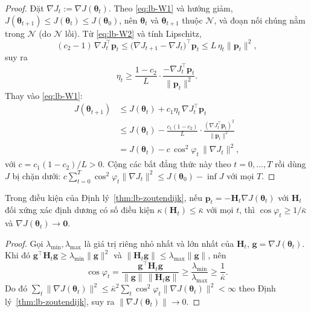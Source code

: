 \begin{proof}
Đặt $\nabla J_t:=\nabla J(\boldsymbol{\theta}_t)$. Theo \eqref{eq:lb-W1} và hướng giảm, $J(\boldsymbol{\theta}_{t+1})\le J(\boldsymbol{\theta}_t)\le J(\boldsymbol{\theta}_0)$, nên $\boldsymbol{\theta}_t$ và $\boldsymbol{\theta}_{t+1}$ thuộc $\mathcal{N}$, và đoạn nối chúng nằm trong $\mathcal{N}$ (do $\mathcal{N}$ lồi). Từ \eqref{eq:lb-W2} và tính Lipschitz,
\begin{equation*}
  (c_2-1)\,\nabla J_t^{\top}\mathbf{p}_t\le\big(\nabla J_{t+1}-\nabla J_t\big)^{\top}\mathbf{p}_t\le L\,\eta_t\|\mathbf{p}_t\|^2,
\end{equation*}
suy ra
\begin{equation*}
  \eta_t\ge\frac{1-c_2}{L}\cdot\frac{-\nabla J_t^{\top}\mathbf{p}_t}{\|\mathbf{p}_t\|^2}.
\end{equation*}
Thay vào \eqref{eq:lb-W1}:
\begin{align*}
  J(\boldsymbol{\theta}_{t+1})&\le J(\boldsymbol{\theta}_t)+c_1\eta_t\,\nabla J_t^{\top}\mathbf{p}_t\\
  &\le J(\boldsymbol{\theta}_t)-\frac{c_1(1-c_2)}{L}\cdot\frac{(\nabla J_t^{\top}\mathbf{p}_t)^2}{\|\mathbf{p}_t\|^2}\\
  &=J(\boldsymbol{\theta}_t)-c\,\cos^2\varphi_t\,\|\nabla J_t\|^2,
\end{align*}
với $c=c_1(1-c_2)/L>0$. Cộng các bất đẳng thức này theo $t=0,\dots,T$ rồi dùng $J$ bị chặn dưới: $c\sum_{t=0}^{T}\cos^2\varphi_t\|\nabla J_t\|^2\le J(\boldsymbol{\theta}_0)-\inf J$ với mọi $T$.
\end{proof}

\begin{proposition}\label{prop:lb-stationary}
Trong điều kiện của Định lý~\ref{thm:lb-zoutendijk}, nếu $\mathbf{p}_t=-\mathbf{H}_t\nabla J(\boldsymbol{\theta}_t)$ với $\mathbf{H}_t$ đối xứng xác định dương có số điều kiện $\kappa(\mathbf{H}_t)\le\bar\kappa$ với mọi $t$, thì $\cos\varphi_t\ge1/\bar\kappa$ và $\nabla J(\boldsymbol{\theta}_t)\to\mathbf{0}$.
\end{proposition}

\begin{proof}
Gọi $\lambda_{\min},\lambda_{\max}$ là giá trị riêng nhỏ nhất và lớn nhất của $\mathbf{H}_t$, $\mathbf{g}=\nabla J(\boldsymbol{\theta}_t)$. Khi đó $\mathbf{g}^{\top}\mathbf{H}_t\mathbf{g}\ge\lambda_{\min}\|\mathbf{g}\|^2$ và $\|\mathbf{H}_t\mathbf{g}\|\le\lambda_{\max}\|\mathbf{g}\|$, nên
\begin{equation*}
  \cos\varphi_t=\frac{\mathbf{g}^{\top}\mathbf{H}_t\mathbf{g}}{\|\mathbf{g}\|\,\|\mathbf{H}_t\mathbf{g}\|}\ge\frac{\lambda_{\min}}{\lambda_{\max}}\ge\frac{1}{\bar\kappa}.
\end{equation*}
Do đó $\sum_t\|\nabla J(\boldsymbol{\theta}_t)\|^2\le\bar\kappa^2\sum_t\cos^2\varphi_t\|\nabla J(\boldsymbol{\theta}_t)\|^2<\infty$ theo Định lý~\ref{thm:lb-zoutendijk}, suy ra $\|\nabla J(\boldsymbol{\theta}_t)\|\to0$.
\end{proof}

